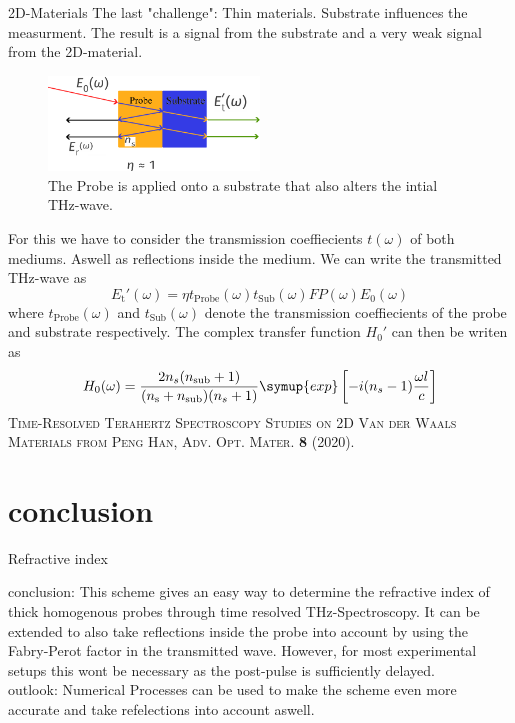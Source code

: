 \documentclass[aspectratio=1610, 9pt]{beamer}
\begin{document}
\begin{frame}{2D-Materials}
  The last "challenge": Thin materials.
  Substrate influences the measurment.
  The result is a signal from the substrate and a very weak signal from the 2D-material.
  \begin{figure}
    \includegraphics[width=0.5\textwidth]{images/2d.pdf}
    \caption{The Probe is applied onto a substrate that also alters the intial THz-wave.}
  \end{figure}
\end{frame}

\begin{frame}
  For this we have to consider the transmission coeffiecients $t(\omega)$ of both mediums.
  Aswell as reflections inside the medium.
  We can write the transmitted THz-wave as
  \begin{equation}
    E_\text{t} '(\omega) = \eta t_\text{Probe}(\omega) t_\text{Sub}(\omega)FP(\omega)E_0(\omega)
  \end{equation}
  where $t_\text{Probe}(\omega)$ and $t_\text{Sub}(\omega)$ denote the transmission coeffiecients of the probe and substrate respectively.
  The complex transfer function $H_0'$ can then be writen as 
  \begin{equation}
    H_0(\omega) = \frac{2 n_s(n_\text{sub} + 1)}{(n_\text{s} + n_\text{sub})(n_s + 1)} \symup{exp}\left[ - i (n_s - 1) \frac{\omega l }{c}\right]
  \end{equation}
  \textsc{\textcolor{tugreen}{Time-Resolved Terahertz Spectroscopy Studies on 2D Van der Waals Materials} from Peng Han, Adv. Opt. Mater. \textbf{8} (2020).}
\end{frame}

\section{conclusion}
\begin{frame}{Refractive index}
  \begin{center}
  \textcolor{tugreen}{conclusion:}
  This scheme gives an easy way to determine the refractive index of thick homogenous probes through time resolved THz-Spectroscopy.
  It can be extended to also take reflections inside the probe into account by using the Fabry-Perot factor in the transmitted wave.
  However, for most experimental setups this wont be necessary as the post-pulse is sufficiently delayed.\\
  \textcolor{tugreen}{outlook:}
  Numerical Processes can be used to make the scheme even more accurate and take refelections into account aswell.
\end{center}
\end{frame}
\end{document}
